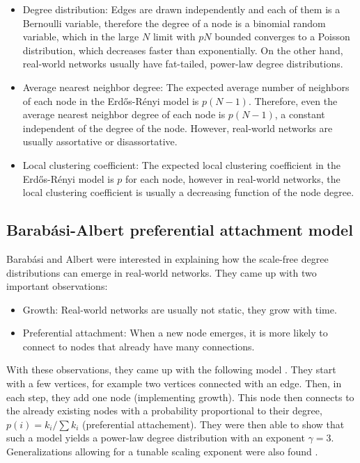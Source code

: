 \begin{itemize}
    \item Degree distribution: Edges are drawn independently and each of them is a Bernoulli variable, therefore the degree of a node is a binomial random variable, which in the large $N$ limit with $pN$ bounded converges to a Poisson distribution, which decreases faster than exponentially. On the other hand, real-world networks usually have fat-tailed, power-law degree distributions.
    \item Average nearest neighbor degree: The expected average number of neighbors of each node in the Erdős-Rényi model is $p(N-1)$. Therefore, even the average nearest neighbor degree of each node is $p(N-1)$, a constant independent of the degree of the node. However, real-world networks are usually assortative or disassortative.
    \item Local clustering coefficient: The expected local clustering coefficient in the Erdős-Rényi model is $p$ for each node, however in real-world networks, the local clustering coefficient is usually a decreasing function of the node degree.
\end{itemize}

\subsection{Barabási-Albert preferential attachment model}
Barabási and Albert were interested in explaining how the scale-free degree distributions can emerge in real-world networks. They came up with two important observations:

\begin{itemize}
    \item Growth: Real-world networks are usually not static, they grow with time.
    \item Preferential attachment: When a new node emerges, it is more likely to connect to nodes that already have many connections.
\end{itemize}

With these observations, they came up with the following model \cite{Barabasi1999}. They start with a few vertices, for example two vertices connected with an edge. Then, in each step, they add one node (implementing growth). This node then connects to the already existing nodes with a probability proportional to their degree, $p(i) = k_i/\sum k_i$ (preferential attachement). They were then able to show that such a model yields a power-law degree distribution with an exponent $\gamma = 3$. Generalizations allowing for a tunable scaling exponent were also found \cite{Hofstad2016}.

